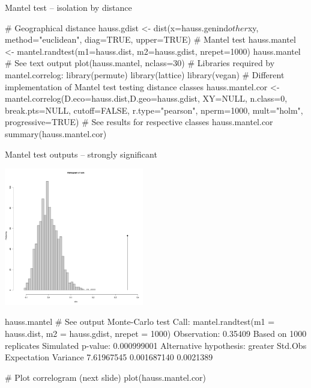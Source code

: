 \documentclass[compress, ucs, xelatex, 11pt, xcolor=svgnames,
  hyperref={
    bookmarks=true,
    unicode=true,
    colorlinks=true,
    pdftitle={Molecular data in R},
    plainpages=false,
    pdfauthor={Vojtech Zeisek},
    pdfsubject={Course about phylogeny and evolution in R},
    pdfcreator={XeLaTeX},
    pdfkeywords={R, evolution, phylogeny, molecular data},
    linkcolor=Tomato,
    anchorcolor=SaddleBrown,
    citecolor=Goldenrod,
    filecolor=DarkMagenta,
    menucolor=Sienna,
    urlcolor=DarkTurquoise,
    pdftex},
  url={hyphens, lowtilde} %
  ]{beamer}
\begin{document}
\begin{frame}[fragile]{Mantel test -- isolation by distance}
  \begin{spluscode}
    # Geographical distance
    hauss.gdist <- dist(x=hauss.genind$other$xy, method="euclidean",
      diag=TRUE, upper=TRUE)
    # Mantel test
    hauss.mantel <- mantel.randtest(m1=hauss.dist, m2=hauss.gdist,
      nrepet=1000)
    hauss.mantel # See text output
    plot(hauss.mantel, nclass=30)
    # Libraries required by mantel.correlog:
    library(permute)
    library(lattice)
    library(vegan)
    # Different implementation of Mantel test testing distance classes
    hauss.mantel.cor <- mantel.correlog(D.eco=hauss.dist,D.geo=hauss.gdist,
      XY=NULL, n.class=0, break.pts=NULL, cutoff=FALSE, r.type="pearson",
      nperm=1000, mult="holm", progressive=TRUE)
    # See results for respective classes
    hauss.mantel.cor
    summary(hauss.mantel.cor)
  \end{spluscode}
\end{frame}

\begin{frame}[fragile]{Mantel test outputs -- strongly significant}
\begin{multicols}{2}
  \includegraphics[height=6cm]{mantel.png}
  \begin{spluscode}
    hauss.mantel # See output
    Monte-Carlo test
    Call: mantel.randtest(m1 =
      hauss.dist, m2 =
      hauss.gdist, nrepet = 1000)
    Observation: 0.35409
    Based on 1000 replicates
    Simulated p-value: 0.000999001
    Alternative hypothesis: greater
      Std.Obs Expectation  Variance
    7.61967545 0.001687140 0.0021389
  \end{spluscode}
  \vfill
  \begin{spluscode}
    # Plot correlogram (next slide)
    plot(hauss.mantel.cor)
  \end{spluscode}
\end{multicols}
\end{frame}
\end{document}

